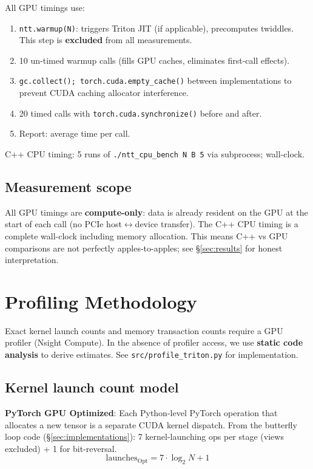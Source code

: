 \documentclass[11pt,a4paper]{article}
\begin{document}
All GPU timings use:
\begin{enumerate}
  \item \texttt{ntt.warmup(N)}: triggers Triton JIT (if applicable), precomputes twiddles.
    This step is \textbf{excluded} from all measurements.
  \item 10 un-timed warmup calls (fills GPU caches, eliminates first-call effects).
  \item \texttt{gc.collect(); torch.cuda.empty\_cache()} between implementations to
    prevent CUDA caching allocator interference.
  \item 20 timed calls with \texttt{torch.cuda.synchronize()} before and after.
  \item Report: average time per call.
\end{enumerate}

C++ CPU timing: 5 runs of \texttt{./ntt\_cpu\_bench N B 5} via subprocess; wall-clock.

\subsection{Measurement scope}

All GPU timings are \textbf{compute-only}: data is already resident on the GPU at the
start of each call (no PCIe host$\leftrightarrow$device transfer). The C++ CPU timing
is a complete wall-clock including memory allocation. This means C++ vs GPU comparisons
are not perfectly apples-to-apples; see §\ref{sec:results} for honest interpretation.

\section{Profiling Methodology}

Exact kernel launch counts and memory transaction counts require a GPU profiler
(Nsight Compute). In the absence of profiler access, we use \textbf{static code
analysis} to derive estimates. See \texttt{src/profile\_triton.py} for implementation.

\subsection{Kernel launch count model}

\textbf{PyTorch GPU Optimized}: Each Python-level PyTorch operation that allocates a new
tensor is a separate CUDA kernel dispatch. From the butterfly loop code (§\ref{sec:implementations}):
7 kernel-launching ops per stage (views excluded) + 1 for bit-reversal.
\[
  \text{launches}_{\text{Opt}} = 7 \cdot \log_2 N + 1
\]
\end{document}
